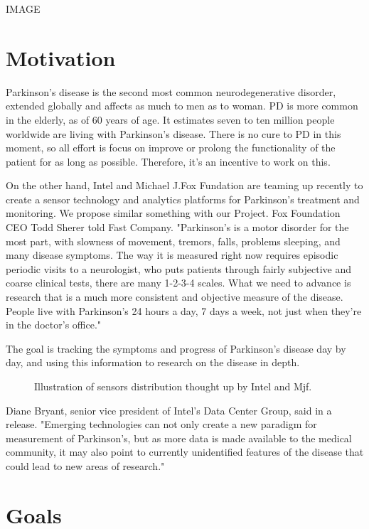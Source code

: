  IMAGE 

\section{Motivation}
Parkinson’s disease is the second most common neurodegenerative disorder, extended globally and affects as much to men as to woman. PD is more common in the elderly, as of 60 years of age. It estimates seven  to ten million people worldwide are living with Parkinson’s disease. There is no cure to PD in this moment, so all effort is focus on improve or prolong the functionality of the patient for as long as possible. Therefore, it’s an incentive to work on this. \cite{ParkinsonDisease}\cite{pdf}

On the other hand, Intel and Michael J.Fox Fundation are teaming up recently to create a sensor technology and analytics platforms for Parkinson’s treatment and monitoring. We propose similar something with our Project. Fox Foundation CEO Todd Sherer told Fast Company. "Parkinson’s is a motor disorder for the most part, with slowness of movement, tremors, falls, problems sleeping, and many disease symptoms. The way it is measured right now requires episodic periodic visits to a neurologist, who puts patients through fairly subjective and coarse clinical tests, there are many 1-2-3-4 scales. What we need to advance is research that is a much more consistent and objective measure of the disease. People live with Parkinson’s 24 hours a day, 7 days a week, not just when they're in the doctor’s office."

The goal is tracking the  symptoms and progress of Parkinson’s disease day by day, and using this information to research on the disease in depth.

\begin{figure}[H]
	\centering
	\caption{Illustration of sensors distribution thought up by Intel and Mjf.}
	\label{fig:arte1}
\end{figure}

Diane Bryant, senior vice president of Intel's Data Center Group, said in a release. "Emerging technologies can not only create a new paradigm for measurement of Parkinson's, but as more data is made available to the medical community, it may also point to currently unidentified features of the disease that could lead to new areas of research." \cite{IntelAndMjf}

\section{Goals}

